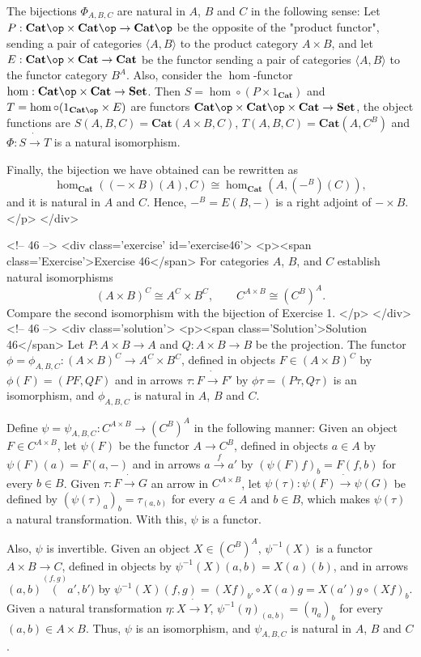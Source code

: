 The bijections $\Phi_{A,B,C}$ are natural in $A$, $B$ and $C$ in the following sense: Let $P:\mathbf{Cat}\op\times\mathbf{Cat}\op\to\mathbf{Cat}\op$ be the opposite of the "product functor", sending a pair of categories $\langle A,B\rangle$ to the product category $A\times B$, and let $E:\mathbf{Cat}\op\times\mathbf{Cat}\to\mathbf{Cat}$ be the functor sending a pair of categories $\langle A,B\rangle$ to the functor category $B^A$. Also, consider the $\hom$-functor $\hom:\mathbf{Cat}\op\times\mathbf{Cat}\to\mathbf{Set}$. Then $S=\hom\circ (P\times 1_{\mathbf{Cat}})$ and $T=\hom\circ(1_{\mathbf{Cat}\op}\times E)$ are functors $\mathbf{Cat}\op\times\mathbf{Cat}\op\times\mathbf{Cat}\to\mathbf{Set}$, the object functions are $S(A,B,C)=\mathbf{Cat}(A\times B,C)$, $T(A,B,C)=\mathbf{Cat}(A,C^B)$ and $\Phi:S\dot{\to} T$ is a natural isomorphism.

Finally, the bijection we have obtained can be rewritten as
\[\hom_{\mathbf{Cat}}((-\times B)(A),C)\cong\hom_{\mathbf{Cat}}(A,(- ^B)(C)),\]
and it is natural in $A$ and $C$. Hence, $-^B=E(B,-)$ is a right adjoint of $-\times B$.
</p>
</div>

<!-- 46 -->
<div class='exercise' id='exercise46'>
<p><span class='Exercise'>Exercise 46</span>
For categories $A$, $B$, and $C$ establish natural isomorphisms
\[(A\times B)^C\cong A^C\times B^C,\qquad C^{A\times B}\cong (C^B)^A.\]
Compare the second isomorphism with the bijection of Exercise 1.
</p>
</div>
<!-- 46 -->
<div class='solution'>
<p><span class='Solution'>Solution 46</span>
Let $P:A\times B\to A$ and $Q:A\times B\to B$ be the projection. The functor $\phi=\phi_{A,B,C}:(A\times B)^C\to A^C\times B^C$, defined in objects $F\in (A\times B)^C$ by $\phi(F)=(PF,QF)$ and in arrows $\tau:F\dot{\to}F'$ by $\phi\tau=(P\tau,Q\tau)$ is an isomorphism, and $\phi_{A,B,C}$ is natural in $A$, $B$ and $C$.

Define $\psi=\psi_{A,B,C}:C^{A\times B}\to (C^B)^A$ in the following manner: Given an object $F\in C^{A\times B}$, let $\psi(F)$ be the functor $A\to C^B$, defined in objects $a\in A$ by $\psi(F)(a)=F(a,-)$ and in arrows $a\overset{f}{\to}a'$ by $(\psi(F)f)_b=F(f,b)$ for every $b\in B$. Given $\tau:F\dot{\to}G$ an arrow in $C^{A\times B}$, let $\psi(\tau):\psi(F)\dot{\to}\psi(G)$ be defined by $(\psi(\tau)_a)_b=\tau_{(a,b)}$ for every $a\in A$ and $b\in B$, which makes $\psi(\tau)$ a natural transformation. With this, $\psi$ is a functor.

Also, $\psi$ is invertible. Given an object $X\in (C^B)^A$, $\psi^{-1}(X)$ is a functor $A\times B\to C$, defined in objects by $\psi^{-1}(X)(a,b)=X(a)(b)$, and in arrows $(a,b)\overset{(f,g)}(a',b')$ by $\psi^{-1}(X)(f,g)=(Xf)_{b'}\circ X(a)g=X(a')g\circ(Xf)_b$. Given a natural transformation $\eta:X\dot{\to}Y$, $\psi^{-1}(\eta)_{(a,b)}=(\eta_{a})_b$ for every $(a,b)\in A\times B$. Thus, $\psi$ is an isomorphism, and $\psi_{A,B,C}$ is natural in $A$, $B$ and $C$.

